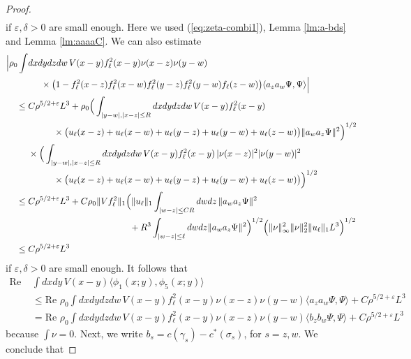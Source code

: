 \documentclass[a4paper,11pt]{article}
\def\eps{\varepsilon}
\numberwithin{equation}{section}
\begin{document}
\begin{proof}
\[\begin{split}
 \end{split} \]
if $\eps , \delta > 0$ are small enough. Here we used (\ref{eq:zeta-combi1}), Lemma \ref{lm:a-bds} and Lemma \ref{lm:aaaaC}. We can also estimate 
\[ \begin{split} 
 \Big| \rho_0 \int &dx dy dz dw \, V(x-y) f_\ell^2 (x-y) \nu (x-z) \nu (y-w) \\ &\hspace{.5cm}\times \big( 1-  f_\ell^2 (x-z) f_\ell^2 (x-w) f_\ell^2 (y-z) f_\ell^2 (y-w) f_\ell(z-w)\big)  \langle a_z a_w \Psi, \Psi \rangle \Big| \\ \leq \; &C \rho^{5/2+\eps} L^3+ \rho_0 \Big( \int_{|y-w| , |x-z| \leq R} dx dy dz dw \, V(x-y)f_\ell^2(x-y) \, \\ &\hspace{1cm} \times \big(u_\ell (x-z) + u_\ell (x-w) + u_\ell (y-z) + u_\ell (y-w) +u_\ell (z-w) \big) \| a_w a_z \Psi \|^2 \Big)^{1/2} \\ &\times \Big(   \int_{|y-w| , |x-z| \leq R} dx dy dz dw \, V(x-y)f_\ell^2(x-y) \, |\nu (x-z)|^2 |\nu (y-w)|^2 \\ &\hspace{1cm} \times  \big(u_\ell (x-z) + u_\ell (x-w) + u_\ell (y-z) + u_\ell (y-w) +u_\ell (z-w) \big) \Big)^{1/2}  \\ \leq \; &C \rho^{5/2+\eps}L^3 + C \rho_0 \|Vf_\ell^2\|_1\Big( \| u_\ell \|_1 \int_{|w-z| \leq C R}  dw dz \, \| a_w a_z \Psi \|^2 \\
 &\hspace{4cm}+ R^3 \int_{|w-z| \leq \ell} dw dz \| a_w a_z \Psi \|^2 \Big)^{1/2}  \Big( \| \nu \|_\infty^2 \| \nu \|_2^2 \| u_\ell \|_1 L^3 \Big)^{1/2} \\ \leq \; &C \rho^{5/2+\eps} L^3
 \end{split} \]
 if $\eps, \delta > 0$ are small enough. It follows that 
 \[ \begin{split}  \text{Re } &\int dx dy \, V(x-y) \langle \phi_1 (x;y) , \phi_5 (x;y) \rangle \\ &\leq \text{Re } \rho_0  \int dx dy dz dw \, V(x-y) f_\ell^2 (x-y) \nu (x-z) \nu (y-w) \langle a_z a_w \Psi, \Psi \rangle + C \rho^{5/2+\eps} L^3  \\ &= \text{Re } \rho_0 \int dx dy dz dw \, V(x-y) f_\ell^2 (x-y) \nu (x-z) \nu (y-w) \langle b_z b_w \Psi, \Psi \rangle + C \rho^{5/2+\eps} L^3 \end{split} \]
 because $\int \nu = 0$. Next, we write $b_s = c(\gamma_s) - c^* (\sigma_s)$, for $s = z,w$. We conclude that 

\end{proof}
\end{document}
